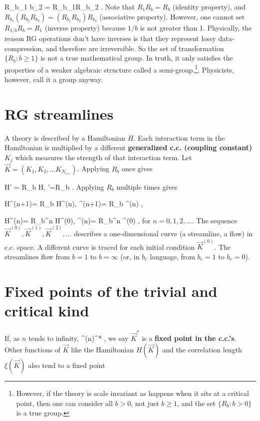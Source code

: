 \documentclass[12pt]{article}
\begin{document}
\beq
R_{b_1 b_2} = R_{b_1}R_{b_2}
\;.
\eeq
Note that
$R_1 R_b = R_b$
(identity property),
and  $R_{b_1}(R_{b_2}R_{b_3})=
(R_{b_1}R_{b_2})R_{b_3}$
(associative property).
However, one cannot
set $R_{1/b}R_{b}=R_1$ (inverse property)
because $1/b$ is not greater than 1.
Physically,
the reason RG operations
don't have inverses is
that they represent lossy data-compression,
and therefore are irreversible.
So the set of transformation
$\{R_b: b\geq 1\}$
is not a true mathematical
group. In truth, it only
satisfies the properties of
a weaker algebraic
structure called a semi-group.\footnote{However,
if the theory is scale invariant
as happens when it sits at a critical point,
then
one can consider all $b> 0$,
not just $b\geq 1$,
and the set $\{R_b: b>0\}$
is a true group.}.
Physicists, however, call it a group
anyway.







\section{RG streamlines}
A theory is described by a Hamiltonian
$H$. Each interaction term
in the Hamiltonian is
multiplied
by a different \textbf{generalized c.c. (coupling
constant)} $K_j$
which measures
the strength of that
interaction term. Let
$\vec{K} = (K_1, K_2, \ldots K_{N_{c.c.}})$.
Applying $R_b$ once
gives

\beq
H' = R_b H,\;\; '=R_b
\;.
\eeq
Applying $R_b$ multiple times gives

\beq
H^{(n+1)}= R_b H^{(n)},
\;\;
^{(n+1)}= R_b ^{(n)}
\;,
\eeq

\beq
H^{(n)}= R_b^n H^{(0)},
\;\;
^{(n)}= R_b^n ^{(0)}
\;,
\eeq
for $n=0,1,2, \ldots$. The
sequence $\vec{K}^{(0)},
\vec{K}^{(1)}, \vec{K}^{(2)}, \ldots$
describes a one-dimensional curve
(a streamline, a flow)
in c.c. space. A different curve
is traced for
each initial condition
$\vec{K}^{(0)}$. The streamlines
flow from $b=1$ to $b=\infty$ (or,
in $b_e$ language,
from $b_e=1$ to $b_e=0$).

\section{Fixed points of the trivial
and critical kind}

If, as $n$ tends to infinity,
\beq
{}^{(n)}\rightarrow {}^*
\;,
\eeq
we say $\vec{K}^*$ is a
\textbf{fixed point in the c.c.'s}.
Other functions of $\vec{K}$
like the Hamiltonian $H(\vec{K})$
and the correlation length $\xi(\vec{K})$
also tend to a fixed point
\end{document}
